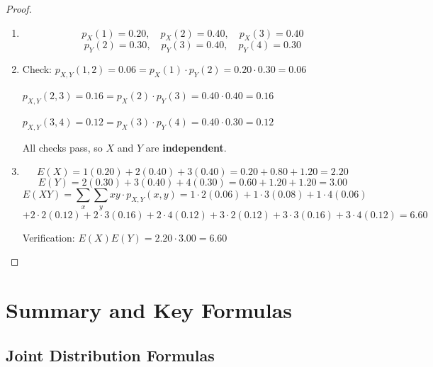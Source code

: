 \begin{proof}
\begin{enumerate}[label=(\alph*)]
    \item 
    \[
    p_X(1) = 0.20, \quad p_X(2) = 0.40, \quad p_X(3) = 0.40
    \]
    \[
    p_Y(2) = 0.30, \quad p_Y(3) = 0.40, \quad p_Y(4) = 0.30
    \]
    
    \item Check: $p_{X,Y}(1, 2) = 0.06 = p_X(1) \cdot p_Y(2) = 0.20 \cdot 0.30 = 0.06$
    
    $p_{X,Y}(2, 3) = 0.16 = p_X(2) \cdot p_Y(3) = 0.40 \cdot 0.40 = 0.16$
    
    $p_{X,Y}(3, 4) = 0.12 = p_X(3) \cdot p_Y(4) = 0.40 \cdot 0.30 = 0.12$
    
    All checks pass, so $X$ and $Y$ are \textbf{independent}.
    
    \item 
    \[
    E(X) = 1(0.20) + 2(0.40) + 3(0.40) = 0.20 + 0.80 + 1.20 = 2.20
    \]
    \[
    E(Y) = 2(0.30) + 3(0.40) + 4(0.30) = 0.60 + 1.20 + 1.20 = 3.00
    \]
    \[
    E(XY) = \sum_{x} \sum_{y} xy \cdot p_{X,Y}(x, y) = 1 \cdot 2(0.06) + 1 \cdot 3(0.08) + 1 \cdot 4(0.06)
    \]
    \[
    + 2 \cdot 2(0.12) + 2 \cdot 3(0.16) + 2 \cdot 4(0.12) + 3 \cdot 2(0.12) + 3 \cdot 3(0.16) + 3 \cdot 4(0.12) = 6.60
    \]
    
    Verification: $E(X)E(Y) = 2.20 \cdot 3.00 = 6.60$
\end{enumerate}
\end{proof}

\newpage

\section{Summary and Key Formulas}

\subsection{Joint Distribution Formulas}

